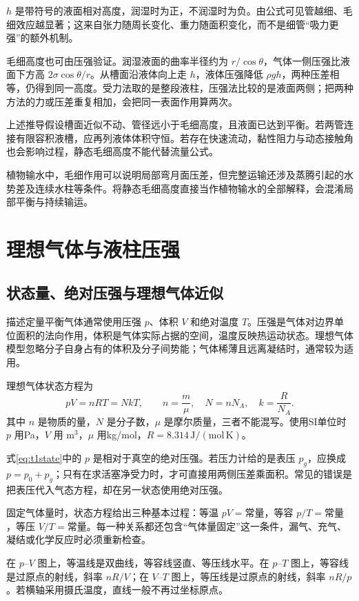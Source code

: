 $h$ 是带符号的液面相对高度，润湿时为正，不润湿时为负。由公式可见管越细、毛细效应越显著；这来自张力随周长变化、重力随面积变化，而不是细管“吸力更强”的额外机制。

毛细高度也可由压强验证。润湿液面的曲率半径约为 $r/\cos\theta$，气体一侧压强比液面下方高 $2\sigma\cos\theta/r$。从槽面沿液体向上走 $h$，液体压强降低 $\rho gh$，两种压差相等，仍得到同一高度。受力法取的是整段液柱，压强法比较的是液面两侧；把两种方法的力或压差重复相加，会把同一表面作用算两次。

上述推导假设槽面近似不动、管径远小于毛细高度，且液面已达到平衡。若两管连接有限容积液槽，应再列液体体积守恒。若存在快速流动，黏性阻力与动态接触角也会影响过程，静态毛细高度不能代替流量公式。

植物输水中，毛细作用可以说明局部弯月面压差，但完整运输还涉及蒸腾引起的水势差及连续水柱等条件。将静态毛细高度直接当作植物输水的全部解释，会混淆局部平衡与持续输运。


\section{理想气体与液柱压强}
\subsection{状态量、绝对压强与理想气体近似}
描述定量平衡气体通常使用压强 $p$、体积 $V$ 和绝对温度 $T$。压强是气体对边界单位面积的法向作用，体积是气体实际占据的空间，温度反映热运动状态。理想气体模型忽略分子自身占有的体积及分子间势能；气体稀薄且远离凝结时，通常较为适用。

理想气体状态方程为
\begin{equation}\label{eq:t1state}
pV=nRT=NkT,\qquad n=\frac m\mu,\quad N=nN_A,\quad k=\frac R{N_A}.
\end{equation}
其中 $n$ 是物质的量，$N$ 是分子数，$\mu$ 是摩尔质量，三者不能混写。使用SI单位时 $p$ 用Pa，$V$ 用 $\mathrm{m^3}$，$\mu$ 用kg/mol，$R=8.314\,\mathrm{J/(mol\,K)}$。

式\eqref{eq:t1state}中的 $p$ 是相对于真空的绝对压强。若压力计给的是表压 $p_g$，应换成 $p=p_0+p_g$；只有在求活塞净受力时，才可直接用两侧压差乘面积。常见的错误是把表压代入气态方程，却在另一状态使用绝对压强。


固定气体量时，状态方程给出三种基本过程：等温 $pV=\text{常量}$，等容 $p/T=\text{常量}$，等压 $V/T=\text{常量}$。每一种关系都还包含“气体量固定”这一条件，漏气、充气、凝结或化学反应时必须重新检查。

在 $p$--$V$ 图上，等温线是双曲线，等容线竖直、等压线水平。在 $p$--$T$ 图上，等容线是过原点的射线，斜率 $nR/V$；在 $V$--$T$ 图上，等压线是过原点的射线，斜率 $nR/p$。若横轴采用摄氏温度，直线一般不再过坐标原点。


